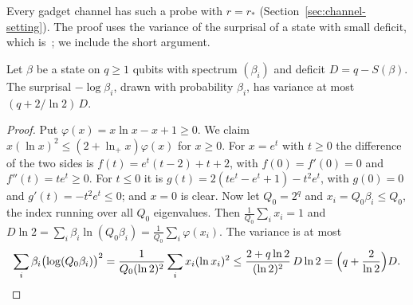 Every gadget channel has such a probe with $r=r_*$ (Section~\ref{sec:channel-setting}). The proof uses the variance of the surprisal of a
state with small deficit, which is~\cite[Lemma~5.9]{DouglasMghirbiB}; we include the short argument.

\begin{lemma}\label{lem:surprisal}
Let $\beta$ be a state on $q\ge1$ qubits with spectrum $(\beta_i)$ and deficit $D=q-S(\beta)$. The surprisal $-\log\beta_i$, drawn with probability
$\beta_i$, has variance at most $(q+2/\ln2)\,D$.
\end{lemma}

\begin{proof}
Put $\varphi(x)=x\ln x-x+1\ge0$. We claim $x(\ln x)^2\le(2+\ln_+x)\varphi(x)$ for $x\ge0$. For $x=e^t$ with $t\ge0$ the difference of the two sides
is $f(t)=e^t(t-2)+t+2$, with $f(0)=f'(0)=0$ and $f''(t)=te^t\ge0$. For $t\le0$ it is $g(t)=2(te^t-e^t+1)-t^2e^t$, with $g(0)=0$ and
$g'(t)=-t^2e^t\le0$; and $x=0$ is clear. Now let $Q_0=2^q$ and $x_i=Q_0\beta_i\le Q_0$, the index running over all $Q_0$ eigenvalues. Then
$\frac1{Q_0}\sum_ix_i=1$ and $D\ln2=\sum_i\beta_i\ln(Q_0\beta_i)=\frac1{Q_0}\sum_i\varphi(x_i)$. The variance is at most
\[
\sum_i\beta_i\bigl(\log(Q_0\beta_i)\bigr)^2=\frac1{Q_0(\ln2)^2}\sum_ix_i(\ln x_i)^2\le\frac{2+q\ln2}{(\ln2)^2}\,D\ln2=\Bigl(q+\frac2{\ln2}\Bigr)D .
\]
\end{proof}

